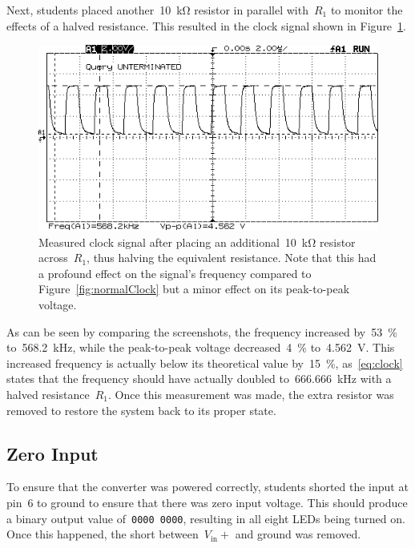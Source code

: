 %
Next, students placed another~\SI{10}{\kilo\ohm} resistor in parallel with~$R_1$ to monitor the effects of a halved resistance.  This resulted in the clock signal shown in Figure~\ref{fig:fastClock}.
%
\begin{figure}[H]
	\centering
	\includegraphics[width=.6\textwidth]{img/shot/part2bshot.png}
	\parbox{.6\textwidth}{
	\caption[Atypical ADC clock signal]{Measured clock signal after placing an additional~\SI{10}{\kilo\ohm} resistor across~$R_1$, thus halving the equivalent resistance.  Note that this had a profound effect on the signal's frequency compared to Figure~\ref{fig:normalClock} but a minor effect on its peak-to-peak voltage.}
	\label{fig:fastClock}}
\end{figure}
%
As can be seen by comparing the screenshots, the frequency increased by~\SI{53}{\percent} to~\SI{568.2}{\kilo\hertz}, while the peak-to-peak voltage decreased~\SI{4}{\percent} to~\SI{4.562}{\volt}.  This increased frequency is actually below its theoretical value by~\SI{15}{\percent}, as~\eqref{eq:clock} states that the frequency should have actually doubled to~\SI{666.666}{\kilo\hertz} with a halved resistance~$R_1$.  Once this measurement was made, the extra resistor was removed to restore the system back to its proper state.

\subsection{Zero Input}
To ensure that the converter was powered correctly, students shorted the input at pin~6 to ground to ensure that there was zero input voltage.  This should produce a binary output value of~\texttt{0000~0000}, resulting in all eight LEDs being turned on.  Once this happened, the short between~$V_\text{in}+$ and ground was removed.

\begin{figure}[H]
	\centering
	
\end{figure}

\begin{figure}[H]
	\centering
	
\end{figure}

\begin{figure}[H]
	\centering
	
\end{figure}

